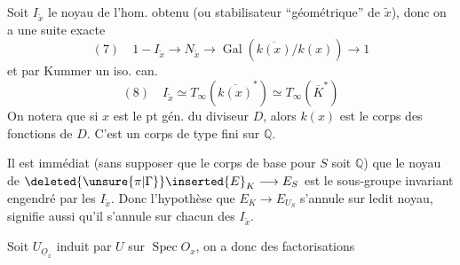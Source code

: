 Soit $I_{\widetilde x}$ le noyau de l'hom. obtenu (ou stabilisateur ``géométrique'' de $\widetilde x$), donc on a une suite exacte
\[
(7)\quad 1-I_{\widetilde x}\longrightarrow N_{\widetilde x}\longrightarrow\operatorname{Gal}(\overline{k(x)}/k(x))\longrightarrow1
\]
et par Kummer un iso. can.
\[
(8)\quad I_{\widetilde x}\simeq T_\infty(\overline{k(x)}^*)\simeq T_\infty(\overline K^*)
\]
On notera que si $x$ est le pt gén. du diviseur $D$, alors $k(x)$ est le corps des fonctions de $D$. C'est un corps de type fini sur $\mathbb Q$.

Il est immédiat (sans supposer que le corps de base pour $S$ soit $\mathbb Q$) que le noyau de $\deleted{\unsure{\pi|\Gamma}}\inserted{E}_K\longrightarrow E_S$ est le sous-groupe invariant engendré par les $I_{\widetilde x}$. Donc l'hypothèse que $E_K\longrightarrow E_{U_S}$ s'annule sur ledit noyau, signifie aussi qu'il s'annule sur chacun des $I_{\widetilde x}$.

Soit  $U_{\underline O_x}$ induit par $U$ sur $\operatorname{Spec}O_x$, on a donc des factorisations
